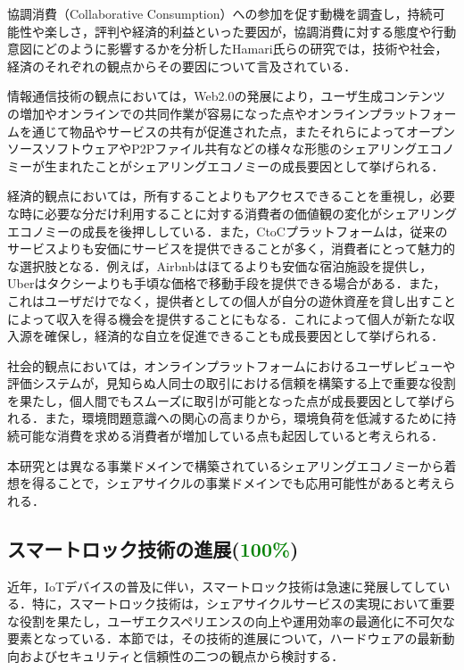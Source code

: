           \par 協調消費（Collaborative Consumption）への参加を促す動機を調査し，持続可能性や楽しさ，評判や経済的利益といった要因が，協調消費に対する態度や行動意図にどのように影響するかを分析したHamari氏らの研究では，技術や社会，経済のそれぞれの観点からその要因について言及されている．
          \par 情報通信技術の観点においては，Web2.0の発展により，ユーザ生成コンテンツの増加やオンラインでの共同作業が容易になった点やオンラインプラットフォームを通じて物品やサービスの共有が促進された点，またそれらによってオープンソースソフトウェアやP2Pファイル共有などの様々な形態のシェアリングエコノミーが生まれたことがシェアリングエコノミーの成長要因として挙げられる．
          \par 経済的観点においては，所有することよりもアクセスできることを重視し，必要な時に必要な分だけ利用することに対する消費者の価値観の変化がシェアリングエコノミーの成長を後押ししている．また，CtoCプラットフォームは，従来のサービスよりも安価にサービスを提供できることが多く，消費者にとって魅力的な選択肢となる．例えば，Airbnbはほてるよりも安価な宿泊施設を提供し，Uberはタクシーよりも手頃な価格で移動手段を提供できる場合がある．また，これはユーザだけでなく，提供者としての個人が自分の遊休資産を貸し出すことによって収入を得る機会を提供することにもなる．これによって個人が新たな収入源を確保し，経済的な自立を促進できることも成長要因として挙げられる．
          \par 社会的観点においては，オンラインプラットフォームにおけるユーザレビューや評価システムが，見知らぬ人同士の取引における信頼を構築する上で重要な役割を果たし，個人間でもスムーズに取引が可能となった点が成長要因として挙げられる．また，環境問題意識への関心の高まりから，環境負荷を低減するために持続可能な消費を求める消費者が増加している点も起因していると考えられる．
          \par 本研究とは異なる事業ドメインで構築されているシェアリングエコノミーから着想を得ることで，シェアサイクルの事業ドメインでも応用可能性があると考えられる．
      
  \subsection{スマートロック技術の進展(\textcolor{green}{100\%})}
    \label{sec:スマートロック技術の進展}
      \par 近年，IoTデバイスの普及に伴い，スマートロック技術は急速に発展してしている．特に，スマートロック技術は，シェアサイクルサービスの実現において重要な役割を果たし，ユーザエクスペリエンスの向上や運用効率の最適化に不可欠な要素となっている．本節では，その技術的進展について，ハードウェアの最新動向およびセキュリティと信頼性の二つの観点から検討する．

